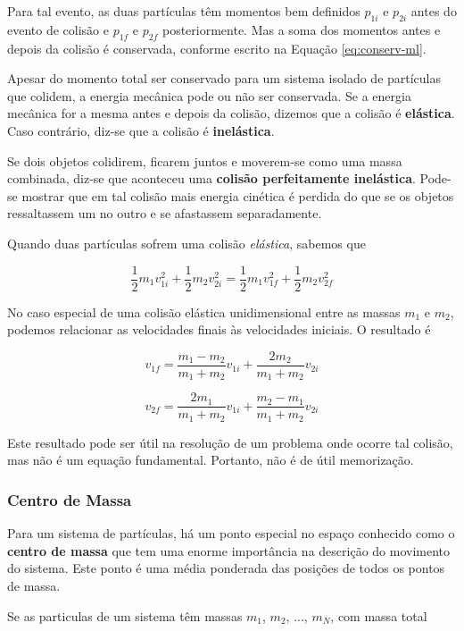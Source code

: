 Para tal evento, as duas partículas têm momentos bem definidos $p_{1i}$ e $p_{2i}$ antes do evento de colisão e $p_{1f}$ e $p_{2f}$ posteriormente. Mas a soma dos momentos antes e depois da colisão é conservada, conforme escrito na Equação \ref{eq:conserv-ml}.

Apesar do momento total ser conservado para um sistema isolado de partículas que colidem, a energia mecânica pode ou não ser conservada. Se a energia mecânica for a mesma antes e depois da colisão, dizemos que a colisão é \textbf{elástica}. Caso contrário, diz-se que a colisão é \textbf{inelástica}.

Se dois objetos colidirem, ficarem juntos e moverem-se como uma massa combinada, diz-se que aconteceu uma \textbf{colisão perfeitamente inelástica}. Pode-se mostrar que em tal colisão mais energia cinética é perdida do que se os objetos ressaltassem um no outro e se afastassem separadamente.

Quando duas partículas sofrem uma colisão \emph{elástica}, sabemos que

$$
\frac{1}{2}m_1v_{1i}^2+\frac{1}{2}m_2v_{2i}^2=\frac{1}{2}m_1v_{1f}^2+\frac{1}{2}m_2v_{2f}^2
$$

No caso especial de uma colisão elástica unidimensional entre as massas $m_1$ e $m_2$, podemos relacionar as velocidades finais às velocidades iniciais. O resultado é

\begin{equation}
    v_{1f}=\frac{m_1-m_2}{m_1+m_2}v_{1i}+\frac{2m_2}{m_1+m_2}v_{2i}
\end{equation}

\begin{equation}
    v_{2f}=\frac{2m_1}{m_1+m_2}v_{1i}+\frac{m_2-m_1}{m_1+m_2}v_{2i}
\end{equation}

Este resultado pode ser útil na resolução de um problema onde ocorre tal colisão, mas não é um equação fundamental. Portanto, não é de útil memorização.

\subsubsection{Centro de Massa}
Para um sistema de partículas, há um ponto especial no espaço conhecido como o \textbf{centro de massa} que tem uma enorme importância na descrição do movimento do sistema. Este ponto é uma média ponderada das posições de todos os pontos de massa.

Se as particulas de um sistema têm massas $m_1$, $m_2$, ..., $m_N$, com massa total

